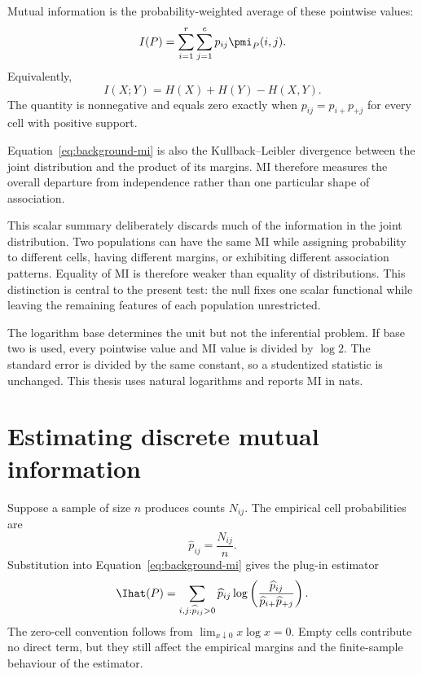 Mutual information is the probability-weighted average of these pointwise
values:
\begin{equation}
  I(P)
  =\sum_{i=1}^{r}\sum_{j=1}^{c}p_{ij}\pmi_P(i,j).
  \label{eq:background-mi}
\end{equation}
Equivalently,
\begin{equation}
  I(X;Y)=H(X)+H(Y)-H(X,Y).
  \label{eq:mi-entropy-form}
\end{equation}
The quantity is nonnegative and equals zero exactly when
\(p_{ij}=p_{i+}p_{+j}\) for every cell with positive support.

Equation~\eqref{eq:background-mi} is also the Kullback--Leibler divergence
between the joint distribution and the product of its margins. MI therefore
measures the overall departure from independence rather than one particular
shape of association.

This scalar summary deliberately discards much of the information in the
joint distribution. Two populations can have the same MI while assigning
probability to different cells, having different margins, or exhibiting
different association patterns. Equality of MI is therefore weaker than
equality of distributions. This distinction is central to the present test:
the null fixes one scalar functional while leaving the remaining features of
each population unrestricted.

The logarithm base determines the unit but not the inferential problem. If
base two is used, every pointwise value and MI value is divided by
\(\log 2\). The standard error is divided by the same constant, so a
studentized statistic is unchanged. This thesis uses natural logarithms and
reports MI in nats.

\section{Estimating discrete mutual information}

Suppose a sample of size \(n\) produces counts \(N_{ij}\). The empirical cell
probabilities are
\begin{equation}
  \widehat p_{ij}=\frac{N_{ij}}{n}.
\end{equation}
Substitution into Equation~\eqref{eq:background-mi} gives the plug-in estimator
\begin{equation}
  \Ihat(P)
  =\sum_{i,j:\widehat p_{ij}>0}
  \widehat p_{ij}
  \log\left(
  \frac{\widehat p_{ij}}
       {\widehat p_{i+}\widehat p_{+j}}
  \right).
  \label{eq:plugin-mi-background}
\end{equation}
The zero-cell convention follows from
\(\lim_{x\downarrow0}x\log x=0\). Empty cells contribute no direct term, but
they still affect the empirical margins and the finite-sample behaviour of the
estimator.

